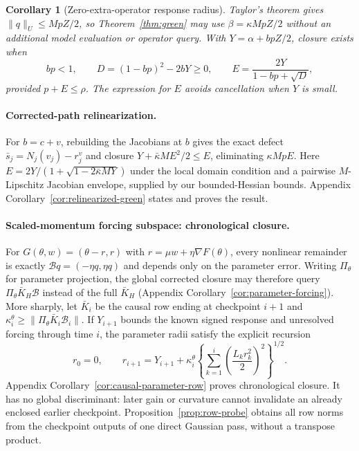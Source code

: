 \documentclass{article}
\newtheorem{corollary}{Corollary}
\begin{document}
\begin{corollary}[Zero-extra-operator response radius]
\label{cor:radius}
Taylor's theorem gives
$\lVert q\rVert_U\le MpZ/2$, so Theorem~\ref{thm:green} may use
$\beta=\kappa MpZ/2$ without an additional model evaluation or operator
query.  With $Y=\alpha+bpZ/2$, closure exists when
\begin{equation}
 bp<1,
 \qquad
 D=(1-bp)^2-2bY\ge0,
 \qquad
 E=\frac{2Y}{1-bp+\sqrt D},
 \label{eq:response-root}
\end{equation}
provided $p+E\le\rho$.  The expression for $E$ avoids cancellation when
$Y$ is small.
\end{corollary}

\paragraph{Corrected-path relinearization.}
For $b=c+v$, rebuilding the Jacobians at $b$ gives the exact defect
$\bar s_j=N_j(v_j)-r^v_j$ and closure
$Y+\bar\kappa ME^2/2\le E$, eliminating $\kappa MpE$.  Here
$E=2Y/(1+\sqrt{1-2\bar\kappa MY})$ under the local domain condition and a
pairwise $M$-Lipschitz Jacobian envelope, supplied by our bounded-Hessian
bounds.  Appendix Corollary~\ref{cor:relinearized-green} states and proves the result.

\paragraph{Scaled-momentum forcing subspace: chronological closure.}
For $G(\theta,w)=(\theta-r,r)$ with
$r=\mu w+\eta\nabla F(\theta)$, every nonlinear remainder is exactly
$\mathcal Bq=(-\eta q,\eta q)$ and depends only on the parameter error.
Writing $\Pi_\theta$ for parameter projection, the global corrected closure may
therefore query $\Pi_\theta\bar K_H\mathcal B$ instead of the full
$\bar K_H$ (Appendix Corollary~\ref{cor:parameter-forcing}).  More sharply,
let $\bar K_i$ be the causal row ending at checkpoint $i+1$ and
$\kappa_i^\theta\ge\|\Pi_\theta\bar K_i\mathcal B_i\|$.  If $Y_{i+1}$ bounds
the known signed response and unresolved forcing through time $i$, the
parameter radii satisfy the explicit recursion
\begin{equation}
 r_0=0,\qquad
 r_{i+1}=Y_{i+1}+\kappa_i^\theta
 \left\{\sum_{k=1}^{i}
 \left(\frac{L_kr_k^2}{2}\right)^2\right\}^{1/2}.
 \label{eq:causal-row-main}
\end{equation}
Appendix Corollary~\ref{cor:causal-parameter-row} proves chronological closure.
It has no global discriminant: later gain or curvature cannot invalidate an
already enclosed earlier checkpoint.  Proposition~\ref{prop:row-probe} obtains
all row norms from the checkpoint outputs of one direct Gaussian pass, without
a transpose product.
\end{document}
